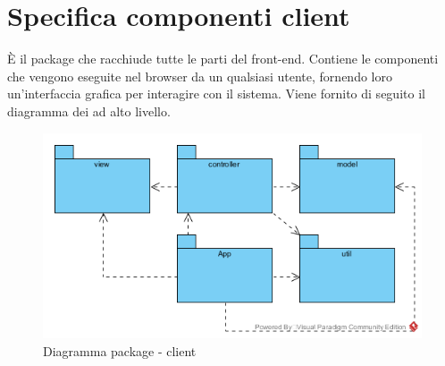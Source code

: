 \section{Specifica componenti client}
È il package che racchiude tutte le parti del front-end. Contiene le componenti che vengono eseguite nel browser da un qualsiasi utente, fornendo loro un’interfaccia grafica per interagire con il sistema.
Viene fornito di seguito il diagramma dei  ad alto livello.
\begin{center}
	\begin{figure}[H]
		\centering \includegraphics[scale=4, max width=\textwidth, max height=\myheight]{../img/diagrammiClassi/architetturaClient.png}
		\caption{Diagramma package - client}
	\end{figure}
\end{center}

